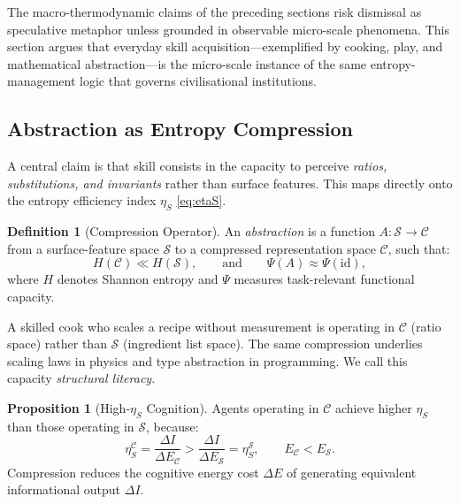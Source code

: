 \documentclass[12pt,a4paper]{article}
\theoremstyle{definition}
\newtheorem{definition}{Definition}[section]
\newtheorem{proposition}{Proposition}[section]
\begin{document}
The macro-thermodynamic claims of the preceding sections risk dismissal as
speculative metaphor unless grounded in observable micro-scale phenomena.
This section argues that everyday skill acquisition---exemplified by cooking,
play, and mathematical abstraction---is the micro-scale instance of the same
entropy-management logic that governs civilisational institutions.

\subsection{Abstraction as Entropy Compression}

A central claim is that skill consists in the capacity to perceive \emph{ratios,
substitutions, and invariants} rather than surface features.  This maps
directly onto the entropy efficiency index $\eta_S$ \eqref{eq:etaS}.

\begin{definition}[Compression Operator]
  An \emph{abstraction} is a function $A : \mathcal{S} \to \mathcal{C}$ from
  a surface-feature space $\mathcal{S}$ to a compressed representation space
  $\mathcal{C}$, such that:
  \begin{equation}
    H(\mathcal{C}) \ll H(\mathcal{S}), \qquad
    \text{and} \qquad
    \Psi(A) \approx \Psi(\mathrm{id}),
  \end{equation}
  where $H$ denotes Shannon entropy and $\Psi$ measures task-relevant
  functional capacity.
\end{definition}

\noindent A skilled cook who scales a recipe without measurement is operating
in $\mathcal{C}$ (ratio space) rather than $\mathcal{S}$ (ingredient list
space).  The same compression underlies scaling laws in physics and type
abstraction in programming.  We call this capacity \emph{structural literacy}.

\begin{proposition}[High-$\eta_S$ Cognition]
  Agents operating in $\mathcal{C}$ achieve higher $\eta_S$ than those
  operating in $\mathcal{S}$, because:
  \begin{equation}
    \eta_S^{\mathcal{C}} = \frac{\Delta I}{\Delta E_{\mathcal{C}}}
    > \frac{\Delta I}{\Delta E_{\mathcal{S}}}
    = \eta_S^{\mathcal{S}},
    \qquad E_{\mathcal{C}} < E_{\mathcal{S}}.
  \end{equation}
  Compression reduces the cognitive energy cost $\Delta E$ of generating
  equivalent informational output $\Delta I$.
\end{proposition}
\end{document}
